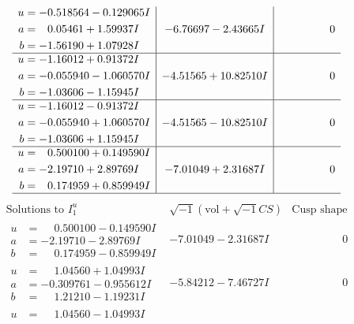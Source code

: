 \documentclass[1p]{elsarticle_modified}
\theoremstyle{definition}
\newcommand{\I}{\sqrt{-1}}
\begin{document}
$$\begin{array}{c|c|c}
\begin{aligned}
u &= -0.518564 - 0.129065 I \\
a &= \phantom{-}0.05461 + 1.59937 I \\
b &= -1.56190 + 1.07928 I\end{aligned}
 & -6.76697 - 2.43665 I & \phantom{-0.000000 } 0 \\ \hline\begin{aligned}
u &= -1.16012 + 0.91372 I \\
a &= -0.055940 - 1.060570 I \\
b &= -1.03606 - 1.15945 I\end{aligned}
 & -4.51565 + 10.82510 I & \phantom{-0.000000 } 0 \\ \hline\begin{aligned}
u &= -1.16012 - 0.91372 I \\
a &= -0.055940 + 1.060570 I \\
b &= -1.03606 + 1.15945 I\end{aligned}
 & -4.51565 - 10.82510 I & \phantom{-0.000000 } 0 \\ \hline\begin{aligned}
u &= \phantom{-}0.500100 + 0.149590 I \\
a &= -2.19710 + 2.89769 I \\
b &= \phantom{-}0.174959 + 0.859949 I\end{aligned}
 & -7.01049 + 2.31687 I & \phantom{-0.000000 } 0\\
 \hline 
 \end{array}$$\newpage$$\begin{array}{c|c|c}  
\text{Solutions to }I^u_{1}& \I (\text{vol} + \sqrt{-1}CS) & \text{Cusp shape}\\
 \hline 
\begin{aligned}
u &= \phantom{-}0.500100 - 0.149590 I \\
a &= -2.19710 - 2.89769 I \\
b &= \phantom{-}0.174959 - 0.859949 I\end{aligned}
 & -7.01049 - 2.31687 I & \phantom{-0.000000 } 0 \\ \hline\begin{aligned}
u &= \phantom{-}1.04560 + 1.04993 I \\
a &= -0.309761 - 0.955612 I \\
b &= \phantom{-}1.21210 - 1.19231 I\end{aligned}
 & -5.84212 - 7.46727 I & \phantom{-0.000000 } 0 \\ \hline\begin{aligned}
u &= \phantom{-}1.04560 - 1.04993 I \\

\end{aligned}
\end{array}$$
\end{document}
